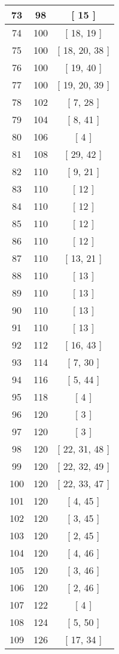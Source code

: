 \begin{center}
\begin{longtable}[H]{|| c c c ||}
\hline
73 & 98 & [ 15 ] \\ 
\hline
74 & 100 & [ 18, 19 ] \\ 
\hline
75 & 100 & [ 18, 20, 38 ] \\ 
\hline
76 & 100 & [ 19, 40 ] \\ 
\hline
77 & 100 & [ 19, 20, 39 ] \\ 
\hline
78 & 102 & [ 7, 28 ] \\ 
\hline
79 & 104 & [ 8, 41 ] \\ 
\hline
80 & 106 & [ 4 ] \\ 
\hline
81 & 108 & [ 29, 42 ] \\ 
\hline
82 & 110 & [ 9, 21 ] \\ 
\hline
83 & 110 & [ 12 ] \\ 
\hline
84 & 110 & [ 12 ] \\ 
\hline
85 & 110 & [ 12 ] \\ 
\hline
86 & 110 & [ 12 ] \\ 
\hline
87 & 110 & [ 13, 21 ] \\ 
\hline
88 & 110 & [ 13 ] \\ 
\hline
89 & 110 & [ 13 ] \\ 
\hline
90 & 110 & [ 13 ] \\ 
\hline
91 & 110 & [ 13 ] \\ 
\hline
92 & 112 & [ 16, 43 ] \\ 
\hline
93 & 114 & [ 7, 30 ] \\ 
\hline
94 & 116 & [ 5, 44 ] \\ 
\hline
95 & 118 & [ 4 ] \\ 
\hline
96 & 120 & [ 3 ] \\ 
\hline
97 & 120 & [ 3 ] \\ 
\hline
98 & 120 & [ 22, 31, 48 ] \\ 
\hline
99 & 120 & [ 22, 32, 49 ] \\ 
\hline
100 & 120 & [ 22, 33, 47 ] \\ 
\hline
101 & 120 & [ 4, 45 ] \\ 
\hline
102 & 120 & [ 3, 45 ] \\ 
\hline
103 & 120 & [ 2, 45 ] \\ 
\hline
104 & 120 & [ 4, 46 ] \\ 
\hline
105 & 120 & [ 3, 46 ] \\ 
\hline
106 & 120 & [ 2, 46 ] \\ 
\hline
107 & 122 & [ 4 ] \\ 
\hline
108 & 124 & [ 5, 50 ] \\ 
\hline
109 & 126 & [ 17, 34 ] \\ 

\end{longtable}
\end{center}

